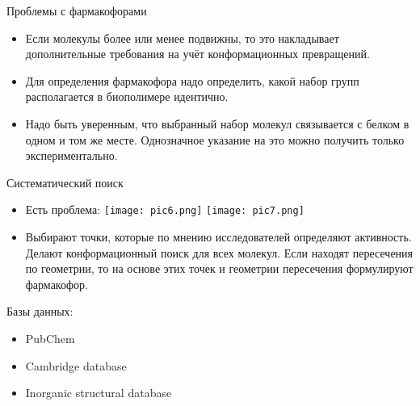 \begin{frame}[plain]
\end{frame}

\begin{frame}{Проблемы с фармакофорами}
	\begin{itemize}

\item Если молекулы более или менее подвижны, то это накладывает дополнительные требования на учёт конформационных превращений.
\item	 Для определения фармакофора надо определить, какой набор групп располагается в биополимере идентично.
\item	  Надо быть уверенным, что выбранный набор молекул связывается с белком в одном и том же месте. Однозначное указание на это можно получить только экспериментально.
	\end{itemize}
\end{frame}

\begin{frame}{Систематический поиск}
	\begin{itemize}
		\item  Есть проблема: \newline
					\texttt{[image: pic6.png]}
					\texttt{[image: pic7.png]}
		\item	Выбирают точки, которые по мнению исследователей определяют активность. Делают конформационный поиск для всех молекул. Если находят пересечения по геометрии, то на основе этих точек и геометрии пересечения формулируют фармакофор.
			\end{itemize}
		\end{frame}

\begin{frame}{Базы данных:}{}
 \begin{itemize}
  \item
  PubChem
\vspace{0.2cm}
  \item
  Cambridge database
\vspace{0.2cm}
  \item
   Inorganic structural database  
   \vspace{0.2cm}
 \end{itemize}
			  \setlength{\fboxsep}{0pt}



\end{frame}
	
